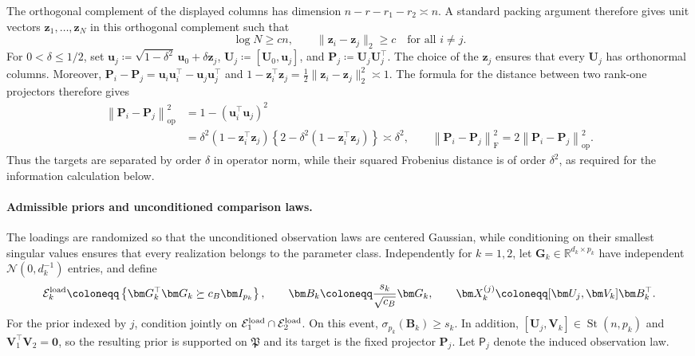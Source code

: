 \documentclass[11pt]{article}
\newcommand{\trans}{\top}
\newcommand{\opn}[1]{\left\lVert #1\right\rVert_{\mathrm{op}}}
\newcommand{\frn}[1]{\left\lVert #1\right\rVert_{\mathrm{F}}}
\begin{document}
The orthogonal complement of the displayed columns has dimension
$n-r-r_1-r_2\asymp n$. A standard packing argument therefore gives unit
vectors $\bm z_1,\ldots,\bm z_N$ in this orthogonal complement such that
\begin{equation}
\label{eq:ambient-packing}
  \log N\ge cn,
  \qquad
  \|\bm z_i-\bm z_j\|_2\ge c
  \quad\text{for all }i\ne j.
\end{equation}
For $0<\delta\le1/2$, set
$\bm u_j\coloneqq\sqrt{1-\delta^2}\,\bm u_0+\delta\bm z_j$,
$\bm U_j\coloneqq[\bm U_0,\bm u_j]$, and
$\bm P_j\coloneqq\bm U_j\bm U_j^\trans$.  The choice of the
$\bm z_j$ ensures that every $\bm U_j$ has orthonormal columns.  Moreover,
$\bm P_i-\bm P_j
=\bm u_i\bm u_i^\trans-\bm u_j\bm u_j^\trans$ and
$1-\bm z_i^\trans\bm z_j
=\frac12\|\bm z_i-\bm z_j\|_2^2\asymp1$.  The formula for the distance
between two rank-one projectors therefore gives
\begin{equation}
\label{eq:fano-target-separation}
\begin{aligned}
  \opn{\bm P_i-\bm P_j}^2
  &=
  1-(\bm u_i^\trans\bm u_j)^2 \\
  &=
  \delta^2(1-\bm z_i^\trans\bm z_j)
  \left\{
    2-\delta^2(1-\bm z_i^\trans\bm z_j)
  \right\}
  \asymp\delta^2,
  \qquad
  \frn{\bm P_i-\bm P_j}^2
  =
  2\opn{\bm P_i-\bm P_j}^2.
\end{aligned}
\end{equation}
Thus the targets are separated by order $\delta$ in operator norm, while
their squared Frobenius distance is of order $\delta^2$, as required for
the information calculation below.

\paragraph{Admissible priors and unconditioned comparison laws.}
The loadings are randomized so that the unconditioned observation laws are
centered Gaussian, while conditioning on their smallest singular values
ensures that every realization belongs to the parameter class.  Independently
for $k=1,2$, let
$\bm G_k\in\mathbb R^{d_k\times p_k}$ have independent
$\mathcal N(0,d_k^{-1})$ entries, and define
\[
  \mathcal E_k^{\rm load}
  \coloneqq
  \left\{
    \bm G_k^\trans\bm G_k\succeq c_B\bm I_{p_k}
  \right\},
  \qquad
  \bm B_k
  \coloneqq
  \frac{s_k}{\sqrt{c_B}}\bm G_k,
  \qquad
  \bm X_k^{(j)}
  \coloneqq
  [\bm U_j,\bm V_k]\bm B_k^\trans.
\]
For the prior indexed by $j$, condition jointly on
$\mathcal E_1^{\rm load}\cap\mathcal E_2^{\rm load}$.  On this event,
$\sigma_{p_k}(\bm B_k)\ge s_k$.  In addition,
$[\bm U_j,\bm V_k]\in\operatorname{St}(n,p_k)$ and
$\bm V_1^\trans\bm V_2=\bm 0$, so the resulting prior is supported on
$\mathfrak P$ and its target is the fixed projector $\bm P_j$.  Let
$\mathsf P_j$ denote the induced observation law.
\end{document}
